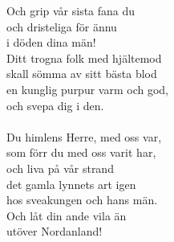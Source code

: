 Och grip vår sista fana du\\
och dristeliga för ännu\\
i döden dina män!\\
Ditt trogna folk med hjältemod\\
skall sömma av sitt bästa blod\\
en kunglig purpur varm och god,\\
och svepa dig i den.\\
\\
Du himlens Herre, med oss var,\\
som förr du med oss varit har,\\
och liva på vår strand\\
det gamla lynnets art igen\\
hos sveakungen och hans män.\\
Och låt din ande vila än\\
utöver Nordanland!

